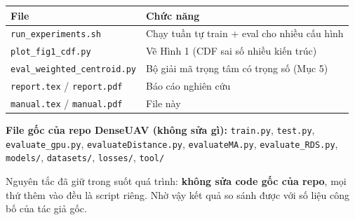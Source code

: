 \documentclass[11pt]{article}
\newcommand{\cmd}[1]{\texttt{\footnotesize #1}}
\begin{document}
\begin{center}
\begin{tabularx}{\textwidth}{lL}
\toprule
\textbf{File} & \textbf{Chức năng} \\
\midrule
\cmd{run\_experiments.sh} & Chạy tuần tự train + eval cho nhiều cấu hình \\
\cmd{plot\_fig1\_cdf.py} & Vẽ Hình 1 (CDF sai số nhiều kiến trúc) \\
\cmd{eval\_weighted\_centroid.py} & Bộ giải mã trọng tâm có trọng số (Mục 5) \\
\cmd{report.tex} / \cmd{report.pdf} & Báo cáo nghiên cứu \\
\cmd{manual.tex} / \cmd{manual.pdf} & File này \\
\bottomrule
\end{tabularx}
\end{center}

\textbf{File gốc của repo DenseUAV (không sửa gì):}
\texttt{train.py}, \texttt{test.py}, \texttt{evaluate\_gpu.py}, \texttt{evaluateDistance.py}, \texttt{evaluateMA.py}, \texttt{evaluate\_RDS.py}, \texttt{models/}, \texttt{datasets/}, \texttt{losses/}, \texttt{tool/}

Nguyên tắc đã giữ trong suốt quá trình: \textbf{không sửa code gốc của repo}, mọi thứ thêm vào đều là script riêng. Nhờ vậy kết quả so sánh được với số liệu công bố của tác giả gốc.
\end{document}
